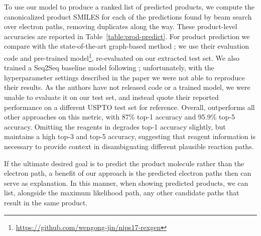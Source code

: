 To use our model to produce a ranked list of predicted products, we compute the canonicalized product SMILES for each of the predictions found by beam search over electron paths, removing duplicates along the way. 
These product-level accuracies are reported in Table~\ref{table:prod-predict}.
For product prediction we compare with the state-of-the-art graph-based method \cite{jin2017predicting};
we use their evaluation code and pre-trained model\footnote{\url{https://github.com/wengong-jin/nips17-rexgen}},
re-evaluated on our extracted test set.%
We also trained a Seq2Seq baseline model following \cite{schwaller2017found};
unfortunately, with the hyperparameter settings described in the paper we were not able to reproduce their results.
As the authors have not released code or a trained model, we were unable to evaluate it on our test set, and instead quote their reported performance on a different USPTO test set for reference.
Overall, \ourModelR outperforms all other approaches on this metric, with 87\% top-1 accuracy and 95.9\% top-5 accuracy.
Omitting the reagents in \ourModelR degrades top-1 accuracy slightly, but maintains a high top-3 and top-5 accuracy,
suggesting that reagent information is necessary to provide context in disambiguating different plausible reaction paths.



If the ultimate desired goal is to predict the product molecule rather than the electron path,
a benefit of our approach is the predicted electron paths then can serve as explanation. 
In this manner, when showing predicted products, we can list, alongside the maximum likelihood path, any other candidate paths that result in the same product. 

%






